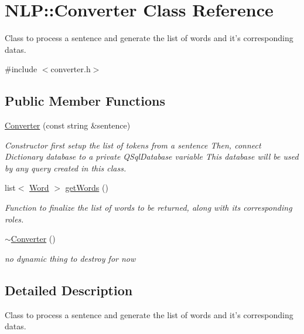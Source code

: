 \hypertarget{classNLP_1_1Converter}{\section{N\-L\-P\-:\-:Converter Class Reference}
\label{classNLP_1_1Converter}
}


Class to process a sentence and generate the list of words and it's corresponding datas.  




{\ttfamily \#include $<$converter.\-h$>$}

\subsection*{Public Member Functions}
\begin{DoxyCompactItemize}
\item 
\hyperlink{classNLP_1_1Converter_a7da0cffead471133931098b132ed9631}{Converter} (const string \&sentence)
\begin{DoxyCompactList}\small\item\em Constructor first setup the list of tokens from a sentence Then, connect Dictionary database to a private Q\-Sql\-Database variable This database will be used by any query created in this class. \end{DoxyCompactList}\item 
list$<$ \hyperlink{classNLP_1_1Word}{Word} $>$ \hyperlink{classNLP_1_1Converter_a136cb6f6f522af85ec0a4cc4dac61645}{get\-Words} ()
\begin{DoxyCompactList}\small\item\em Function to finalize the list of words to be returned, along with its corresponding roles. \end{DoxyCompactList}\item 
\hypertarget{classNLP_1_1Converter_a417bff3c0e0b23e25e231fa088c0cd05}{\hyperlink{classNLP_1_1Converter_a417bff3c0e0b23e25e231fa088c0cd05}{$\sim$\-Converter} ()}\label{classNLP_1_1Converter_a417bff3c0e0b23e25e231fa088c0cd05}

\begin{DoxyCompactList}\small\item\em no dynamic thing to destroy for now \end{DoxyCompactList}\end{DoxyCompactItemize}


\subsection{Detailed Description}
Class to process a sentence and generate the list of words and it's corresponding datas. 

